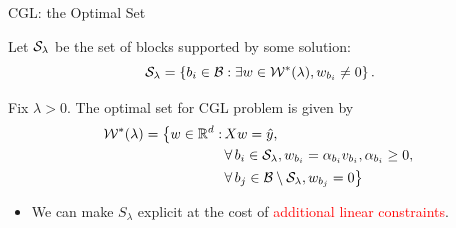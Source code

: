 \documentclass[usenames,dvipsnames,mathserif,notheorems]{beamer}
\newcommand{\red}[1]{\textcolor{Red}{#1}}
\begin{document}
\begin{frame}{CGL: the Optimal Set}

	Let \( \mathcal{S}_\lambda \) be the set of blocks supported by some solution:
	\[
		\mathcal{S}_\lambda = \left\{{b_i} \in \mathcal{B} : \exists w \in \mathcal{W}^*(\lambda), w_{b_i} \neq 0\right\}.
	\]

	\pause

	\begin{proposition}[Informal]
		Fix \( \lambda > 0 \).
		The optimal set for CGL problem is
		given by
		\begin{equation*}
			\begin{aligned}
				\mathcal{W}^*(\lambda) =
				\big\{  w  \in  \mathbb{R}^d : \, & X w = \hat y,                                     \\
				                          & \forall \, {b_i}  \in  \mathcal{S}_\lambda,
				w_{b_i} =  \alpha_{b_i} v_{b_i}, \alpha_{b_i} \geq 0, \,                                  \\
				                          & \forall \, b_j \in \mathcal{B} \setminus \mathcal{S}_\lambda,
				w_{b_j} = 0
				\big\}
			\end{aligned}
		\end{equation*}

	\end{proposition}

	\pause
	\begin{itemize}
		\item We can make \( S_\lambda \) explicit at the cost of
		      \red{additional linear constraints}.
	\end{itemize}

\end{frame}
\end{document}
